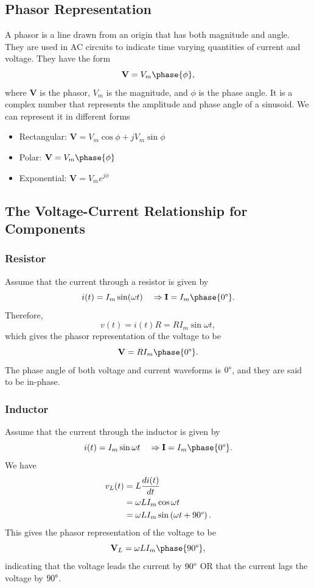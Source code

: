 \documentclass{article}
\begin{document}
\subsection{Phasor Representation}
A phasor is a line drawn from an origin that has both magnitude and angle. They are used in AC circuits to indicate time varying quantities of current and voltage. They have the form 
\[
    \mathbf{V}=V_m\phase{\phi },
\]
where $\mathbf{V}$ is the phasor, $V_m$ is the magnitude, and $\phi $ is the phase angle. It is a complex number that represents the amplitude and phase angle of a sinusoid. We can represent it in different forms
\begin{itemize}
    \item Rectangular: $\mathbf{V}=V_m\cos\phi +jV_m\sin\phi $
    \item Polar: $\mathbf{V}=V_m\phase{\phi }$
    \item Exponential: $\mathbf{V}=V_me^{j\phi }$
\end{itemize}

\subsection{The Voltage-Current Relationship for Components}
\subsubsection{Resistor}
Assume that the current through a resistor is given by 
\[
    i(t)=I_m\sin(\omega t)\quad\Rightarrow\mathbf{I}=I_m\phase{0\degree}.
\]
Therefore,
\[
    v(t)=i(t)R=RI_m\sin\omega t,
\]
which gives the phasor representation of the voltage to be 
\[
    \mathbf{V}=RI_m\phase{0\degree}.
\]
The phase angle of both voltage and current waveforms is $0\degree$, and they are said to be in-phase.

\subsubsection{Inductor}
Assume that the current through the inductor is given by 
\[
    i(t)=I_m\sin\omega t\quad\Rightarrow\mathbf{I}=I_m\phase{0\degree}.
\]
We have
\begin{align*}
    v_L(t) &= L \frac{d i(t)}{d t}\\
           &=\omega LI_m\cos\omega t\\
           &=\omega LI_m\sin \left( \omega t+90\degree \right).
\end{align*}
This gives the phasor representation of the voltage to be 
\[
    \mathbf{V}_L=\omega LI_m\phase{90\degree},
\]
indicating that the voltage leads the current by $90\degree$ OR that the current lags the voltage by $90\degree$.
\end{document}
